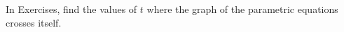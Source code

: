 \begin{exerciseset}{In Exercises}{, find the values of $t$ where the graph of the parametric equations crosses itself.}





\end{exerciseset}
